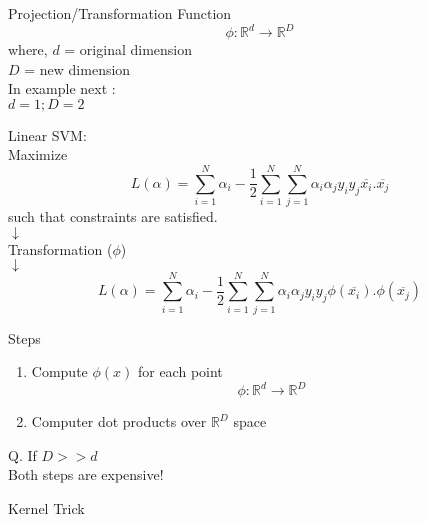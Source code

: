 \documentclass{beamer}
\begin{document}
{
	
}



\begin{frame}{Projection/Transformation Function}
	\begin{equation*}
	\phi : \mathbb{R}^{d} \rightarrow \mathbb{R}^{D}
	\end{equation*}
	where, $d$ = original dimension \\
	\hspace{1cm} $D$ = new dimension \\
	In example next :\\
	\hspace{1cm} $d = 1; D = 2$ 
\end{frame}

{
	
}
\begin{frame}{}
	Linear SVM:\\
	\hspace{1cm} Maximize\\
	\begin{equation*}
	L(\alpha) = \sum_{i=1}^{N}\alpha_{i} - \frac{1}{2}\sum_{i=1}^{N}\sum_{j=1}^{N}\alpha_{i}\alpha_{j}y_{i}y_{j}\overline{x_{i}}.\overline{x_{j}}
	\end{equation*}
	\hspace{1cm} such that constraints are satisfied.\\
	\hspace{5cm} $\downarrow$\\
	\hspace{3.8cm} Transformation ($\phi$)\\
	\hspace{5cm} $\downarrow$\\
	\begin{equation*}
	L(\alpha) = \sum_{i=1}^{N}\alpha_{i} - \frac{1}{2}\sum_{i=1}^{N}\sum_{j=1}^{N}\alpha_{i}\alpha_{j}y_{i}y_{j}\phi(\overline{x_{i}}).\phi(\overline{x_{j}})
	\end{equation*}
\end{frame}
\begin{frame}{Steps}
	\begin{enumerate}
		\item Compute $\phi(x)$ for each point \\
		\begin{equation*}
		\phi: \mathbb{R}^{d} \rightarrow \mathbb{R}^{D}
		\end{equation*}
		\item Computer dot products over $\mathbb{R}^{D}$ space
	\end{enumerate}
	\pause \hspace{0.1cm} Q. If $D >> d$ \\
	\pause \hspace{0.6cm} Both steps are expensive!
\end{frame}
\begin{frame}{Kernel Trick}
	
\end{frame}
\end{document}
